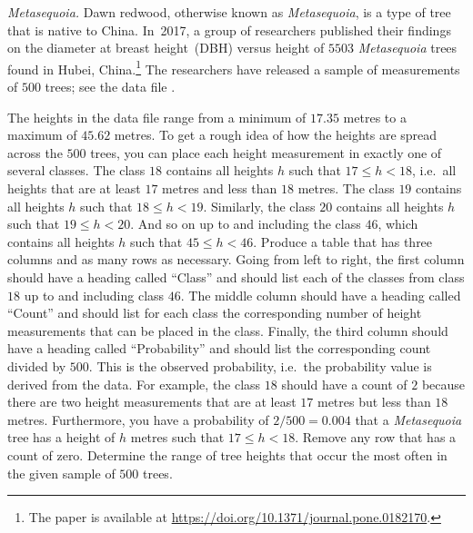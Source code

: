 \documentclass[a4paper,oneside,12pt]{article}
\begin{document}
\begin{problem}
\item\emph{Metasequoia.}
  Dawn redwood, otherwise known as \emph{Metasequoia}, is a type of
  tree that is native to China.  In~2017, a group of researchers
  published their findings on the diameter at breast height~(DBH)
  versus height of $5503$ \emph{Metasequoia} trees found in Hubei,
  China.\footnote{
    The paper is available at
    \url{https://doi.org/10.1371/journal.pone.0182170}.
  }
  The researchers have released a sample of measurements of $500$
  trees; see the data file .
  \begin{packedenum}
  \item\label{subprob:logistic:metasequoia_height_distribution}
    The heights in the data file  range from a
    minimum of $17.35$ metres to a maximum of $45.62$ metres.  To get
    a rough idea of how the heights are spread across the $500$ trees,
    you can place each height measurement in exactly one of several
    classes.  The class $18$ contains all heights $h$ such that
    $17 \leq h < 18$, i.e.~all heights that are at least $17$ metres
    and less than $18$ metres.  The class $19$ contains all heights
    $h$ such that $18 \leq h < 19$.  Similarly, the class $20$
    contains all heights $h$ such that $19 \leq h < 20$.  And so on up
    to and including the class $46$, which contains all heights $h$
    such that $45 \leq h < 46$.  Produce a table that has three
    columns and as many rows as necessary.  Going from left to right,
    the first column should have a heading called ``Class'' and should
    list each of the classes from class $18$ up to and including class
    $46$.  The middle column should have a heading called ``Count''
    and should list for each class the corresponding number of height
    measurements that can be placed in the class.  Finally, the third
    column should have a heading called ``Probability'' and should
    list the corresponding count divided by $500$.  This is the
    observed probability, i.e.~the probability value is derived from
    the data.  For example, the class $18$ should have a count of $2$
    because there are two height measurements that are at least $17$
    metres but less than $18$ metres.  Furthermore, you have a
    probability of $2 / 500 = 0.004$ that a \emph{Metasequoia} tree
    has a height of $h$ metres such that $17 \leq h < 18$.  Remove any
    row that has a count of zero.  Determine the range of tree heights
    that occur the most often in the given sample of $500$ trees.


\end{packedenum}
\end{problem}
\end{document}
